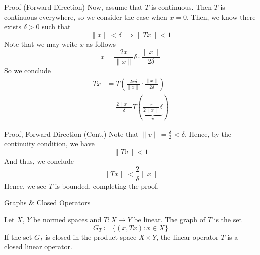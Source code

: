\documentclass[10pt]{beamer}
\begin{document}
		\begin{frame}{Proof (Forward Direction)}
				Now, assume that $T$ is continuous. Then $T$ is continuous everywhere, so we consider the case when $x = 0$. Then, we know there exists $\delta > 0$ such that 
				\begin{equation*}
						\|x\| < \delta \implies \|Tx\| < 1
				\end{equation*}
				Note that we may write $x$ as follows 
				\begin{equation*}
						x = \frac{2x}{\|x\|}\delta \cdot \frac{\|x\|}{2 \delta}
				\end{equation*}
				So we conclude 
				\begin{align*}
						Tx &= T \left( \frac{2x \delta}{\|x\|} \cdot \frac{\|x\|}{2\delta} \right) \\ 
							 &=  \frac{2\|x\|}{\delta}T \left( \underbrace{\frac{x}{2\|x\|} \delta}_{v} \right)
				\end{align*}
		\end{frame}

		\begin{frame}{Proof, Forward Direction (Cont.)}
				Note that $\|v\| = \frac{\delta}{2} < \delta$. Hence, by the continuity condition, we have 
				\begin{equation*}
						\|Tv\| < 1
				\end{equation*}
				And thus, we conclude 
				\begin{equation*}
						\|Tx\| < \frac{2}{\delta}\|x\|
				\end{equation*}
				Hence, we see $T$ is bounded, completing the proof.
		\end{frame}

		\begin{frame}{Graphs \& Closed Operators}
				\begin{definition}
						Let $X$, $Y$ be normed spaces and $T: X\to Y$ be linear. The \alert{graph} of $T$ is the set 
						\begin{equation*}
								G_T \coloneqq \{(x, Tx) : x\in X\}
						\end{equation*}
						If the set $G_T$ is closed in the product space $X\times Y$, the linear operator $T$ is a \alert{closed linear operator}.
				\end{definition}

		\end{frame}
\end{document}
